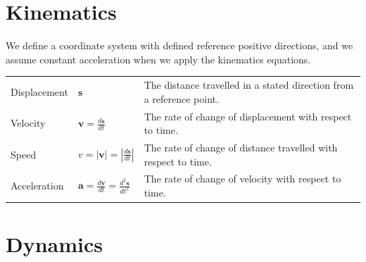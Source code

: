 \documentclass[a4paper,11pt]{article}
\begin{document}
	\section{Kinematics}
	We define a coordinate system with defined reference positive directions, and we assume constant acceleration when we apply the kinematics equations.
	\begin{center}
		\renewcommand{\arraystretch}{1.5}
		\begin{tabular}{@{} l l p{9.1cm} @{}}
			\toprule
			Displacement & $\textbf{s}$ & The distance travelled in a stated direction from a reference point. \\
			Velocity & $\displaystyle \textbf{v} = \frac{d\textbf{s}}{dt}$ & The rate of change of displacement with respect to time.\\
			\rule{0pt}{20pt}Speed & $\displaystyle v=\left|\textbf{v}\right| = \left|\frac{d\textbf{s}}{dt}\right|$ & The rate of change of distance travelled with respect to time. \\
			\rule{0pt}{20pt}Acceleration &  $\displaystyle \textbf{a} = \frac{d\textbf{v}}{dt} = \frac{d^2\textbf{s}}{dt^2}$ & The rate of change of velocity with respect to time. \vspace{4mm}\\
			\bottomrule
		\end{tabular}
	\end{center}
	
	\section{Dynamics}
\end{document}
